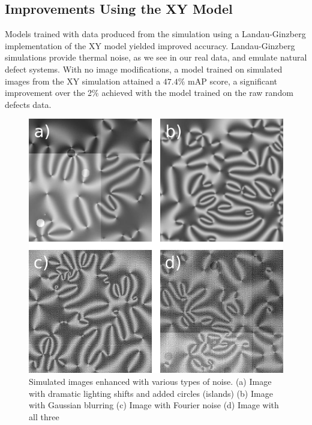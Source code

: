 \documentclass[prl,reprint,showpacs,floatfix,nofootinbib]{revtex4-1}
\begin{document}
\subsection{Improvements Using the XY Model}
Models trained with data produced from the simulation using a Landau-Ginzberg implementation of the XY model yielded improved accuracy. Landau-Ginzberg simulations provide thermal noise, as we see in our real data, and emulate natural defect systems. With no image modifications, a model trained on simulated images from the XY simulation attained a $47.4\%$ mAP score, a significant improvement over the 2\% achieved with the model trained on the raw random defects data. 
\begin{figure}
  \includegraphics[width=\linewidth*3/4]{ImageEnhancement.png}
  \caption{Simulated images enhanced with various types of noise. (a) Image with dramatic lighting shifts and added circles (islands) (b) Image with Gaussian blurring (c) Image with Fourier noise (d) Image with all three}
  \label{fig:Image Enhancement}
\end{figure}
\end{document}
